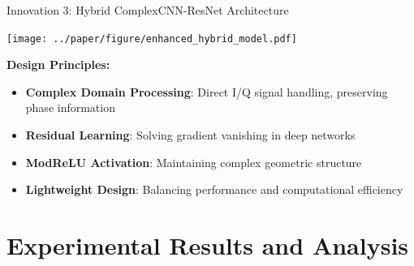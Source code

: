 \documentclass[aspectratio=169]{beamer}
\begin{document}
\begin{frame}{Innovation 3: Hybrid ComplexCNN-ResNet Architecture}
\begin{center}
\texttt{[image: ../paper/figure/enhanced\_hybrid\_model.pdf]}
\end{center}

\textbf{Design Principles:}
\begin{itemize}
\item \textbf{Complex Domain Processing}: Direct I/Q signal handling, preserving phase information
\item \textbf{Residual Learning}: Solving gradient vanishing in deep networks
\item \textbf{ModReLU Activation}: Maintaining complex geometric structure
\item \textbf{Lightweight Design}: Balancing performance and computational efficiency
\end{itemize}
\end{frame}

\section{Experimental Results and Analysis}
\end{document}

